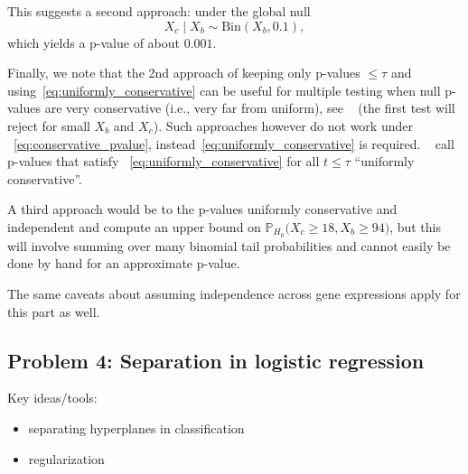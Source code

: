 \begin{enumerate}



This suggests a second approach: under the global null
$$ X_c \mid X_b  \sim \text{Bin}(X_b, 0.1),$$
which yields a p-value of about $0.001$.


Finally, we note that the 2nd approach of keeping only p-values $\leq \tau$ and using~\eqref{eq:uniformly_conservative} can be useful for multiple testing when null p-values are very conservative (i.e., very far from uniform), see ~\citet*{zhao2019multiple} (the first test will reject for small $X_b$ and $X_c$). Such approaches however do not work under ~\eqref{eq:conservative_pvalue}, instead~\eqref{eq:uniformly_conservative} is required. ~\citet*{zhao2019multiple} call p-values that satisfy ~\eqref{eq:uniformly_conservative} for all $t \leq \tau$ ``uniformly conservative''. 

A third approach would be to the p-values uniformly conservative and independent and compute an upper bound on $\mathbb{P}_{H_0} \big( X_c \geq 18 , X_b \geq 94 \big)$, but this will involve summing over many binomial tail probabilities and cannot easily be done by hand for an approximate p-value.

The same caveats about assuming independence across gene expressions apply for this part as well.




\end{enumerate}

\subsection*{Problem 4: Separation in logistic regression}
Key ideas/tools:
\begin{itemize}
\item separating hyperplanes in classification
\item regularization
\end{itemize}

